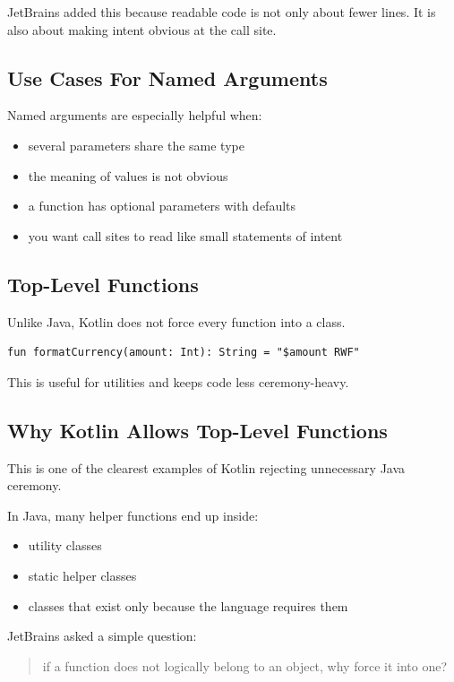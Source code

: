 \documentclass[11pt,a4paper]{article}
\begin{document}
JetBrains added this because readable code is not only about fewer lines. It is also about making intent obvious at the call site.

\subsection{Use Cases For Named Arguments}

Named arguments are especially helpful when:
\begin{itemize}
    \item several parameters share the same type
    \item the meaning of values is not obvious
    \item a function has optional parameters with defaults
    \item you want call sites to read like small statements of intent
\end{itemize}

\subsection{Top-Level Functions}

Unlike Java, Kotlin does not force every function into a class.

\begin{lstlisting}[style=kazekotlin]
fun formatCurrency(amount: Int): String = "$amount RWF"
\end{lstlisting}

This is useful for utilities and keeps code less ceremony-heavy.

\subsection{Why Kotlin Allows Top-Level Functions}

This is one of the clearest examples of Kotlin rejecting unnecessary Java ceremony.

In Java, many helper functions end up inside:
\begin{itemize}
    \item utility classes
    \item static helper classes
    \item classes that exist only because the language requires them
\end{itemize}

JetBrains asked a simple question:
\begin{quote}
if a function does not logically belong to an object, why force it into one?
\end{quote}
\end{document}
